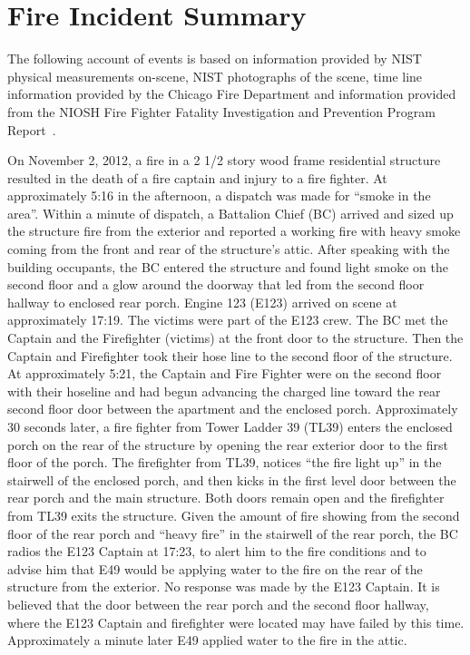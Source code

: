 \documentclass[11pt,oneside]{book}
\begin{document}
\chapter{Fire Incident Summary}
\label{fire_sum}
The following account of events is based on information provided by NIST physical measurements on-scene, NIST photographs of the scene, time line information provided by the Chicago Fire Department and information provided from the NIOSH Fire Fighter Fatality Investigation and Prevention Program Report~\cite{NIOSH:Bowyer}.

On November 2, 2012, a fire in a 2 1/2 story wood frame residential structure resulted in the death of a fire captain and injury to a fire fighter. At approximately 5:16 in the afternoon, a dispatch was made for ``smoke in the area''. Within a minute of dispatch, a Battalion Chief (BC) arrived and sized up the structure fire from the exterior and reported a working fire with heavy smoke coming from the front and rear of the structure's attic. After speaking with the building occupants, the BC entered the structure and found light smoke on the second floor and a glow around the doorway that led from the second floor hallway to enclosed rear porch. Engine 123 (E123) arrived on scene at approximately 17:19. The victims were part of the E123 crew.  The BC met the Captain and the Firefighter (victims) at the front door to the structure.  Then the Captain and Firefighter took their hose line to the second floor of the structure. At approximately 5:21, the Captain and Fire Fighter were on the second floor with their hoseline and had begun advancing the charged line toward the rear second floor door between the apartment and the enclosed porch. Approximately 30 seconds later, a fire fighter from Tower Ladder 39 (TL39) enters the enclosed porch on the rear of the structure by opening the rear exterior door to the first floor of the porch. The firefighter from TL39, notices ``the fire light up'' in the stairwell of the enclosed porch, and then kicks in the first level door between the rear porch and the main structure. Both doors remain open and the firefighter from TL39 exits the structure. Given the amount of fire showing from the second floor of the rear porch and ``heavy fire'' in the stairwell of the rear porch, the BC radios the E123 Captain at 17:23, to alert him to the fire conditions and to advise him that E49 would be applying water to the fire on the rear of the structure from the exterior. No response was made by the E123 Captain. It is believed that the door between the rear porch and the second floor hallway, where the E123 Captain and firefighter were located may have failed by this time.  Approximately a minute later E49 applied water to the fire in the attic.
\end{document}
